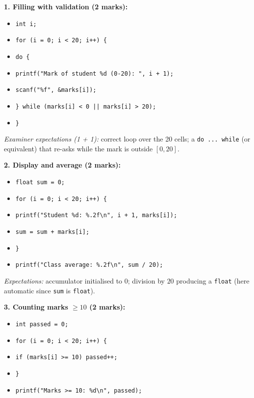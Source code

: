 \documentclass[11pt]{article}
\begin{document}
\begin{corrige}
\textbf{1. Filling with validation (2 marks):}
\begin{itemize}
\item \texttt{int i;}
\item \texttt{for (i = 0; i < 20; i++) \{}
\item \texttt{\quad do \{}
\item \texttt{\quad\quad printf("Mark of student \%d (0-20): ", i + 1);}
\item \texttt{\quad\quad scanf("\%f", \&marks[i]);}
\item \texttt{\quad \} while (marks[i] < 0 || marks[i] > 20);}
\item \texttt{\}}
\end{itemize}
\emph{Examiner expectations (1 + 1):} correct loop over the 20 cells; a \texttt{do ... while} (or equivalent) that re-asks while the mark is outside $[0,20]$.

\textbf{2. Display and average (2 marks):}
\begin{itemize}
\item \texttt{float sum = 0;}
\item \texttt{for (i = 0; i < 20; i++) \{}
\item \texttt{\quad printf("Student \%d: \%.2f\textbackslash n", i + 1, marks[i]);}
\item \texttt{\quad sum = sum + marks[i];}
\item \texttt{\}}
\item \texttt{printf("Class average: \%.2f\textbackslash n", sum / 20);}
\end{itemize}
\emph{Expectations:} accumulator initialised to $0$; division by $20$ producing a \texttt{float} (here automatic since \texttt{sum} is \texttt{float}).

\textbf{3. Counting marks $\ge 10$ (2 marks):}
\begin{itemize}
\item \texttt{int passed = 0;}
\item \texttt{for (i = 0; i < 20; i++) \{}
\item \texttt{\quad if (marks[i] >= 10) passed++;}
\item \texttt{\}}
\item \texttt{printf("Marks >= 10: \%d\textbackslash n", passed);}
\end{itemize}


\end{corrige}
\end{document}
